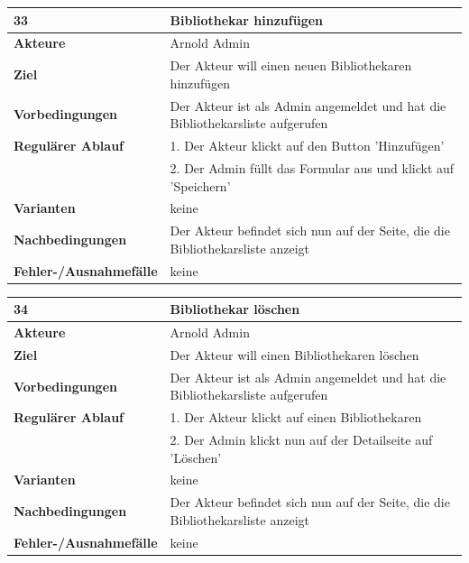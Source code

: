 \documentclass[fontsize=12pt,paper=a4,twoside]{scrartcl}
\begin{document}
\begin{table}[htbp]
\label{33}
\begin{tabular}{|l|p{10cm}|}
\hline 
\textbf{33} & \textbf{Bibliothekar hinzufügen} \\ \hline
\textbf{Akteure} & Arnold Admin\\ \hline
\textbf{Ziel} & Der Akteur will einen neuen Bibliothekaren hinzufügen \\ \hline
\textbf{Vorbedingungen} & Der Akteur ist als Admin angemeldet und hat die Bibliothekarsliste 
aufgerufen \\ \hline
\textbf{Regulärer Ablauf} & 
1. Der Akteur klickt auf den Button 'Hinzufügen' \\
&2. Der Admin füllt das Formular aus und klickt auf 'Speichern'\\
\hline
\textbf{Varianten} & 
keine \\ \hline
\textbf{Nachbedingungen} & Der Akteur befindet sich nun auf der Seite, die die Bibliothekarsliste 
anzeigt\\ \hline
\textbf{Fehler-/Ausnahmefälle} & keine\\
\hline
\end{tabular}
\end{table}



\begin{table}[htbp]
\label{34}
\begin{tabular}{|l|p{10cm}|}
\hline 
\textbf{34} & \textbf{Bibliothekar löschen} \\ \hline
\textbf{Akteure} & Arnold Admin\\ \hline
\textbf{Ziel} & Der Akteur will einen Bibliothekaren löschen \\ \hline
\textbf{Vorbedingungen} & Der Akteur ist als Admin angemeldet und hat die Bibliothekarsliste 
aufgerufen\\\hline
\textbf{Regulärer Ablauf} & 
1. Der Akteur klickt auf einen Bibliothekaren \\
&2. Der Admin klickt nun auf der Detailseite auf 'Löschen'\\
\hline
\textbf{Varianten} & 
keine \\ \hline
\textbf{Nachbedingungen} & Der Akteur befindet sich nun auf der Seite, die die Bibliothekarsliste 
anzeigt\\ \hline
\textbf{Fehler-/Ausnahmefälle} & keine\\
\hline
\end{tabular}
\end{table}
\end{document}
